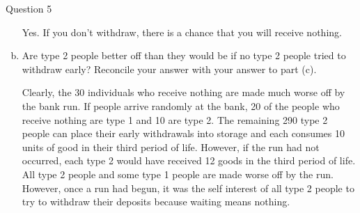 \documentclass[a4paper]{article}
\newif\IfInSansMode
\numberwithin{equation}{section}
\numberwithin{figure}{section}
\begin{document}
\begin{questionbox}{Question 5}
\begin{enumerate}[(a)]
\begin{explanationbox}
				Yes. If you don't withdraw, there is a chance that you will receive nothing.
			\end{explanationbox}
			\item Are type 2 people better off than they would be if no type 2 people tried to withdraw early? Reconcile your answer with your answer to part (c).
			\begin{explanationbox}
				Clearly, the 30 individuals who receive nothing are made much worse off by the bank run. If people arrive randomly at the bank, 20 of the people who receive nothing are type 1 and 10 are type 2. The remaining 290 type 2 people can place their early withdrawals into storage and each consumes 10 units of good in their third period of life. However, if the run had not occurred, each type 2 would have received 12 goods in the third period of life. All type 2 people and some type 1 people are made worse off by the run. However, once a run had begun, it was the self interest of all type 2 people to try to withdraw their deposits because waiting means nothing.
			\end{explanationbox}
		\end{enumerate}
	\end{questionbox}
\end{document}
